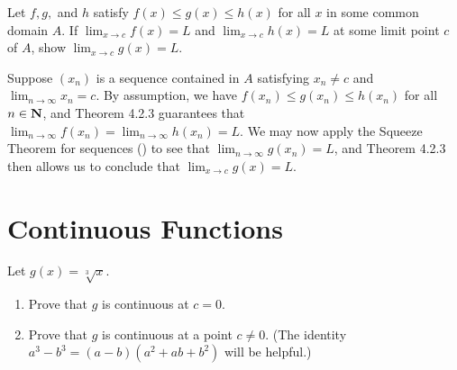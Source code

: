 \documentclass{lew98_solutions}
\begin{document}
\begin{exercise}
\label{ex:4.2.11}
    Let \( f, g, \) and \( h \) satisfy \( f(x) \leq g(x) \leq h(x) \) for all \( x \) in some common domain \( A \). If \( \lim_{x \to c} f(x) = L \) and \( \lim_{x \to c} h(x) = L \) at some limit point \( c \) of \( A \), show \( \lim_{x \to c} g(x) = L \).
\end{exercise}

\begin{solution}
    Suppose \( (x_n) \) is a sequence contained in \( A \) satisfying \( x_n \neq c \) and \( \lim_{n \to \infty} x_n = c \). By assumption, we have \( f(x_n) \leq g(x_n) \leq h(x_n) \) for all \( n \in \mathbf{N} \), and Theorem 4.2.3 guarantees that \( \lim_{n \to \infty} f(x_n) = \lim_{n \to \infty} h(x_n) = L \). We may now apply the Squeeze Theorem for sequences () to see that \( \lim_{n \to \infty} g(x_n) = L \), and Theorem 4.2.3 then allows us to conclude that \( \lim_{x \to c} g(x) = L \).
\end{solution}

\section{Continuous Functions}
\label{sec:4.3}

\begin{exercise}
\label{ex:4.3.1}
    Let \( g(x) = \sqrt[3]{x} \).
    \begin{enumerate}
        \item Prove that \( g \) is continuous at \( c = 0 \).

        \item Prove that \( g \) is continuous at a point \( c \neq 0 \). (The identity \( a^3 - b^3 = (a - b)(a^2 + ab + b^2) \) will be helpful.)
    \end{enumerate}
\end{exercise}
\end{document}

